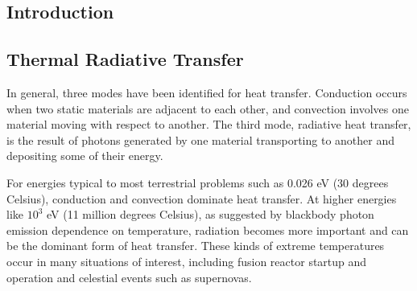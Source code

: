 \begin{center}
\section{Introduction}
\end{center}
\subsection{Thermal Radiative Transfer}\label{sec:intro_trt}
In general, three modes have been identified for heat transfer.  Conduction occurs when two static materials are adjacent to each other, and convection involves one material moving with respect to another.  The third mode, radiative heat transfer, is the result of photons generated by one material transporting to another and depositing some of their energy.  





For energies typical to most terrestrial problems such as 0.026 eV (30 degrees Celsius),  conduction and convection dominate heat transfer.  At higher energies like $10^3$ eV (11 million degrees Celsius),  as suggested by blackbody photon emission dependence on temperature, radiation becomes more important and can be the dominant form of heat transfer.  These kinds of extreme temperatures occur in many situations of interest, including fusion reactor startup and operation and celestial events such as supernovas.



